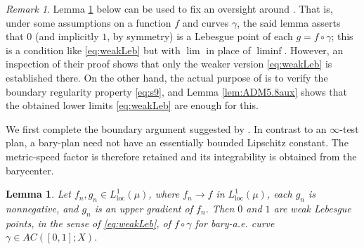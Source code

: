 \documentclass[11pt]{amsart}
\newtheorem{lemma}[theorem]{Lemma}
\theoremstyle{definition}
\theoremstyle{remark}
\newtheorem{remark}[theorem]{Remark}
\numberwithin{equation}{section}
\begin{document}
\begin{remark}\label{rem:ADM5.8aux}
Lemma \ref{lem:ADM5.8} below
can be used to fix an oversight around \cite[Lemma 5.8]{AD:14}. That is, under some
assumptions on a function $f$ and curves $\gamma$, the said lemma asserts that $0$ (and
implicitly $1$, by symmetry) is a Lebesgue point of each $g=f\circ\gamma$; this is a
condition like \eqref{eq:weakLeb} but with $\lim$ in place of $\liminf$. However, an
inspection of their proof shows that only the weaker version \eqref{eq:weakLeb} is
established there. On the other hand, the actual purpose of \cite[Lemma 5.8]{AD:14} is to
verify the boundary regularity property \eqref{eq:s9}, and Lemma \ref{lem:ADM5.8aux} shows
that the obtained lower limits \eqref{eq:weakLeb} are enough for this.
\end{remark}

We first complete the boundary argument suggested by
\cite[Lemma 5.8]{AD:14}.  In contrast to an $\infty$-test plan, a
bary-plan need not have an essentially bounded Lipschitz constant.  The
metric-speed factor is therefore retained and its integrability is
obtained from the barycenter.

\begin{lemma}\label{lem:ADM5.8}
Let $f_n,g_n\in L^1_{\mathrm{loc}}(\mu)$, where $f_n\to f$ in
$L^1_{\mathrm{loc}}(\mu)$, each $g_n$ is nonnegative, and $g_n$ is an upper
gradient of $f_n$.  Then $0$ and $1$ are weak Lebesgue points, in the
sense of \eqref{eq:weakLeb}, of $f\circ\gamma$ for bary-a.e. curve
$\gamma\in AC([0,1];X)$.
\end{lemma}
\end{document}
